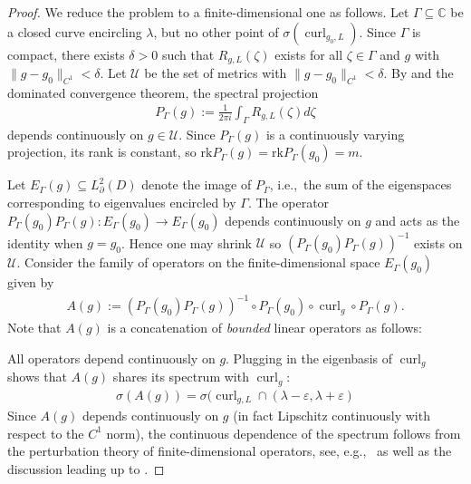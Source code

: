 \documentclass[11pt,reqno]{amsart}
\DeclareMathOperator{\curl}{curl}
\begin{document}
\begin{proof}
    We reduce the problem to a finite-dimensional one as follows. Let $\Gamma \subseteq \mathbb C$ be a closed curve encircling $\lambda$, but no other point of $\sigma(\curl_{g_0,L})$. Since $\Gamma$ is compact, there exists $\delta > 0$ such that $R_{g,L}(\zeta)$ exists for all $\zeta \in \Gamma$ and $g$ with $\|g-g_0\|_{C^1} < \delta$. Let $\mathcal U$ be the set of metrics with $\|g-g_0\|_{C^1} < \delta$. By  and the dominated convergence theorem, the spectral projection 
    \begin{align*}
        P_\Gamma(g) := \frac{1}{2\pi i} \int_\Gamma R_{g,L}(\zeta) d\zeta
    \end{align*}
    depends continuously on $g \in \mathcal U$. Since $P_\Gamma(g)$ is a continuously varying projection, its rank is constant, so $\mathrm{rk} P_\Gamma(g) = \mathrm{rk} P_\Gamma(g_0) = m$.
    
    Let $E_\Gamma(g) \subseteq L^2_\partial(D)$ denote the image of $P_\Gamma$, i.e.,\ the sum of the eigenspaces corresponding to eigenvalues encircled by $\Gamma$. The operator 
    $P_\Gamma(g_0) P_\Gamma(g): E_\Gamma(g_0) \to E_\Gamma(g_0)$ depends continuously on $g$ and acts as the identity when $g = g_0$. Hence one may shrink $\mathcal U$ so $(P_\Gamma(g_0) P_\Gamma(g))^{-1}$ exists on $\mathcal U$. Consider the family of operators on the finite-dimensional space $E_\Gamma(g_0)$ given by
    \begin{align*}
        A(g) := \left( P_\Gamma(g_0) P_\Gamma(g) \right)^{-1} \circ P_\Gamma(g_0) \circ \curl_{g} \circ P_\Gamma(g).
    \end{align*}
    Note that $A(g)$ is a concatenation of \emph{bounded} linear operators as follows:
    
    
    \noindent All operators depend continuously on $g$. Plugging in the eigenbasis of $\curl_g$ shows that $A(g)$ shares its spectrum with $\curl_g$:
    \begin{align*}
        \sigma(A(g)) = \sigma(\curl_{g,L} \cap (\lambda-\varepsilon,\lambda+\varepsilon)
    \end{align*}
    Since $A(g)$ depends continuously on $g$ (in fact Lipschitz continuously with respect to the $C^1$ norm), the continuous dependence of the spectrum follows from the perturbation theory of finite-dimensional operators, see, e.g.,\ \cite[Theorem 5.1 and Theorem 5.2]{Kato} as well as the discussion leading up to \cite[Theorem 5.2]{Kato}.
\end{proof}
\end{document}
